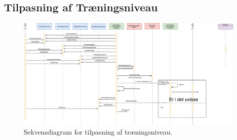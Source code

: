 \subsection*{Tilpasning af Træningsniveau}

\begin{figure} [H]
\centering
\includegraphics[width=1\textwidth]{figures/Sek/SEKTilpasning}
\caption{Sekvensdiagram for tilpasning af træningsniveau.}
\label{fig:SEKTilpasning}
\end{figure}
